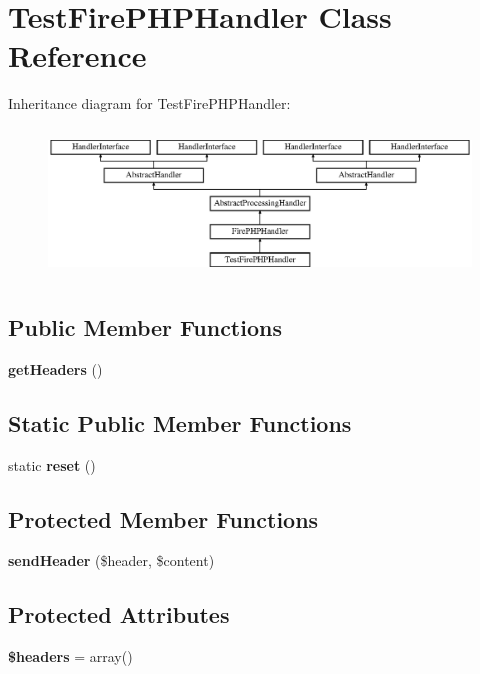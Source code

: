 \section{Test\+Fire\+P\+H\+P\+Handler Class Reference}
\label{class_monolog_1_1_handler_1_1_test_fire_p_h_p_handler}
Inheritance diagram for Test\+Fire\+P\+H\+P\+Handler\+:\begin{figure}[H]
\begin{center}
\leavevmode
\includegraphics[height=4.000000cm]{class_monolog_1_1_handler_1_1_test_fire_p_h_p_handler}
\end{center}
\end{figure}
\subsection*{Public Member Functions}
\begin{DoxyCompactItemize}
\item 
{\bf get\+Headers} ()
\end{DoxyCompactItemize}
\subsection*{Static Public Member Functions}
\begin{DoxyCompactItemize}
\item 
static {\bf reset} ()
\end{DoxyCompactItemize}
\subsection*{Protected Member Functions}
\begin{DoxyCompactItemize}
\item 
{\bf send\+Header} (\$header, \$content)
\end{DoxyCompactItemize}
\subsection*{Protected Attributes}
\begin{DoxyCompactItemize}
\item 
{\bf \$headers} = array()
\end{DoxyCompactItemize}
